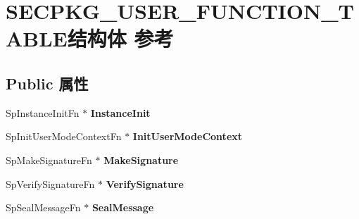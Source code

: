 \hypertarget{struct_s_e_c_p_k_g___u_s_e_r___f_u_n_c_t_i_o_n___t_a_b_l_e}{}\section{S\+E\+C\+P\+K\+G\+\_\+\+U\+S\+E\+R\+\_\+\+F\+U\+N\+C\+T\+I\+O\+N\+\_\+\+T\+A\+B\+L\+E结构体 参考}
\label{struct_s_e_c_p_k_g___u_s_e_r___f_u_n_c_t_i_o_n___t_a_b_l_e}
\subsection*{Public 属性}
\begin{DoxyCompactItemize}
\item 
\mbox{\label{struct_s_e_c_p_k_g___u_s_e_r___f_u_n_c_t_i_o_n___t_a_b_l_e_aeedf79d018adef4b137d9fcf7c2eee7d}} 
Sp\+Instance\+Init\+Fn $\ast$ {\bfseries Instance\+Init}
\item 
\mbox{\label{struct_s_e_c_p_k_g___u_s_e_r___f_u_n_c_t_i_o_n___t_a_b_l_e_a9b89ab7ebb962ecd9ca229032df986d6}} 
Sp\+Init\+User\+Mode\+Context\+Fn $\ast$ {\bfseries Init\+User\+Mode\+Context}
\item 
\mbox{\label{struct_s_e_c_p_k_g___u_s_e_r___f_u_n_c_t_i_o_n___t_a_b_l_e_af1c9f81b7a62b56176c0ab099243f229}} 
Sp\+Make\+Signature\+Fn $\ast$ {\bfseries Make\+Signature}
\item 
\mbox{\label{struct_s_e_c_p_k_g___u_s_e_r___f_u_n_c_t_i_o_n___t_a_b_l_e_a7911381e71c7cffa2497689f437d851e}} 
Sp\+Verify\+Signature\+Fn $\ast$ {\bfseries Verify\+Signature}
\item 
\mbox{\label{struct_s_e_c_p_k_g___u_s_e_r___f_u_n_c_t_i_o_n___t_a_b_l_e_a89132f55560a1057c20c5afc8b8ca955}} 
Sp\+Seal\+Message\+Fn $\ast$ {\bfseries Seal\+Message}
\item 
\mbox{\label{struct_s_e_c_p_k_g___u_s_e_r___f_u_n_c_t_i_o_n___t_a_b_l_e_ac44bb5ea68fb7d27957cfebfadca65e4}} 

\end{DoxyCompactItemize}
